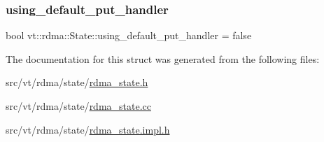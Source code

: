 \subsubsection{\texorpdfstring{using\+\_\+default\+\_\+put\+\_\+handler}{using\_default\_put\_handler}}
{\footnotesize\ttfamily bool vt\+::rdma\+::\+State\+::using\+\_\+default\+\_\+put\+\_\+handler = false}



The documentation for this struct was generated from the following files\+:\begin{DoxyCompactItemize}
\item 
src/vt/rdma/state/\hyperlink{rdma__state_8h}{rdma\+\_\+state.\+h}\item 
src/vt/rdma/state/\hyperlink{rdma__state_8cc}{rdma\+\_\+state.\+cc}\item 
src/vt/rdma/state/\hyperlink{rdma__state_8impl_8h}{rdma\+\_\+state.\+impl.\+h}\end{DoxyCompactItemize}
